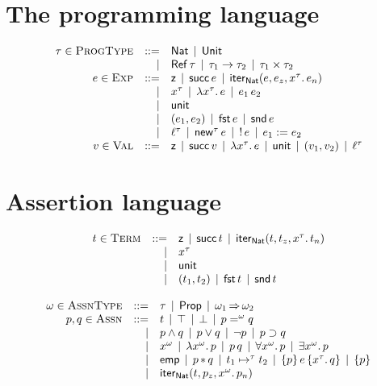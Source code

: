 \documentclass[12pt,a4paper]{article}
\begin{document}
\section{The programming language}

\begin{definition}
  \[\begin{array}{rrlll}
  \tau \in \textsc{ProgType} & ::= & \mathsf{Nat} \,\mid\, \mathsf{Unit}
  \\ & \mid & \mathsf{Ref}\,{\tau} \,\mid\, \tau_1 \to \tau_2 \,\mid\, \tau_1 \times \tau_2
  \\
  e \in \textsc{Exp} & ::= & \mathsf{z} \,\mid\, \mathsf{succ}\,{e} \,\mid\, \mathsf{iter}_{\mathsf{Nat}}(e,e_z,{x^\tau}.\,{e_n})
  \\ & \mid & x^\tau \,\mid\, \lambda{x^\tau}.\,{e} \,\mid\, {e_1}\,{e_2}
  \\ & \mid & \mathsf{unit}
  \\ & \mid & (e_1,e_2) \,\mid\, {\mathsf{fst}}\,{e} \,\mid\, {\mathsf{snd}}\,{e}
  \\ & \mid & \ell^\tau \,\mid\, {\mathsf{new}^{\tau}}\,{e} \,\mid\, {!}\,{e} \,\mid\, {e_1}:={e_2}
  \\
  v \in \textsc{Val} & ::= & \mathsf{z} \,\mid\, \mathsf{succ}\,{v} \,\mid\, \lambda{x^\tau}.\,{e} \,\mid\, \mathsf{unit} \,\mid\, (v_1,v_2) \,\mid\, \ell^\tau
  \end{array}\]
\end{definition}

\section{Assertion language}

\begin{definition}[Terms]
  \[\GRbeg
  t \in \Term \GRis \z \GRmid \succ{t} \GRmid \iternat{t}{t_z}{x^\tau}{t_n}
  \GRal x^\tau %
  \GRal \unit
  \GRal (t_1,t_2) \GRmid \fst{t} \GRmid \snd{t}
  \GRend\]
\end{definition}

\begin{definition}[Assertions]
  \[\begin{array}{rrlll}
  \omega \in \textsc{AssnType} & ::= & \tau \,\mid\, \mathsf{Prop} \,\mid\, \omega_1 \operatorname{\Rightarrow} \omega_2
  \\
  p,q \in \textsc{Assn} & ::= & t \,\mid\, \top \,\mid\, \bot \,\mid\, p =^\omega q
  \\ & \mid & p \wedge q \,\mid\, p \vee q \,\mid\, \neg p \,\mid\, p \supset q
  \\ & \mid & x^\omega \,\mid\, \lambda{x^\omega}.\,{p} \,\mid\, {p}\,{q} \,\mid\, \forall{x^\omega}.\,{p} \,\mid\, \exists{x^\omega}.\,{p}
  \\ & \mid & \mathsf{emp} \,\mid\, p \operatorname{\ast} q \,\mid\, t_1 \mapsto^\tau t_2 \,\mid\, \{p\}\,e\,\{{x^\tau}.\,{q}\} \,\mid\, \{p\}
  \\ & \mid & \mathsf{iter}_{\mathsf{Nat}}(t,p_z,{x^\omega}.\,{p_n})
  \end{array}\]
\end{definition}
\end{document}
